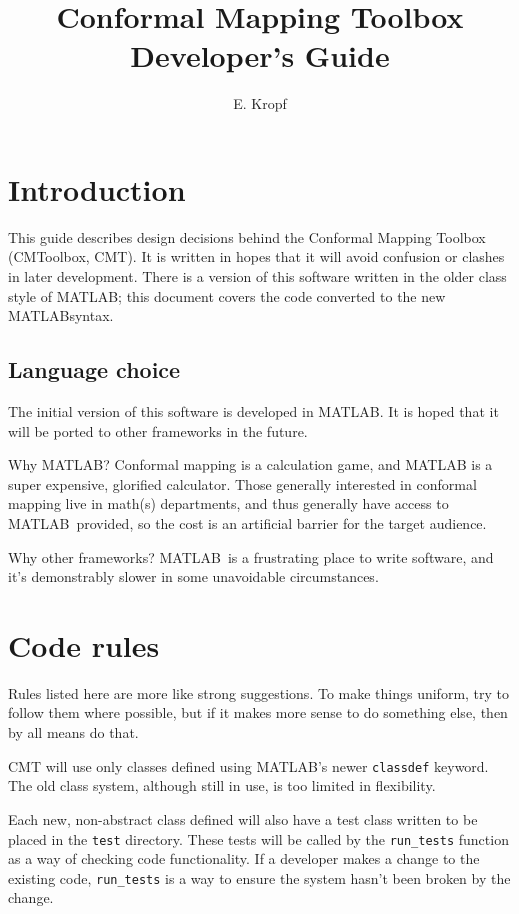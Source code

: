 \documentclass{article}
\title{Conformal Mapping Toolbox Developer's Guide}
\author{E. Kropf}
\newcommand{\code}[1]{\texttt{#1}}
\newcommand{\matlab}{MATLAB}
\begin{document}
\maketitle
\tableofcontents
\clearpage

\section{Introduction}
This guide describes design decisions behind the Conformal Mapping Toolbox (CMToolbox, CMT). It is written in hopes that it will avoid confusion or clashes in later development. There is a version of this software written in the older class style of \matlab; this document covers the code converted to the new \matlab syntax.

\subsection{Language choice}
The initial version of this software is developed in \matlab. It is hoped that it will be ported to other frameworks in the future.

Why \matlab? Conformal mapping is a calculation game, and MATLAB is a super expensive, glorified calculator. Those generally interested in conformal mapping live in math(s) departments, and thus generally have access to \matlab\ provided, so the cost is an artificial barrier for the target audience.

Why other frameworks? \matlab\ is a frustrating place to write software, and it's demonstrably slower in some unavoidable circumstances.

\section{Code rules}
Rules listed here are more like strong suggestions. To make things uniform, try to follow them where possible, but if it makes more sense to do something else, then by all means do that.

CMT will use only classes defined using \matlab's newer \code{classdef} keyword. The old class system, although still in use, is too limited in flexibility.

Each new, non-abstract class defined will also have a test class written to be placed in the \code{test} directory. These tests will be called by the \code{run\_tests} function as a way of checking code functionality. If a developer makes a change to the existing code, \code{run\_tests} is a way to ensure the system hasn't been broken by the change.
\end{document}

